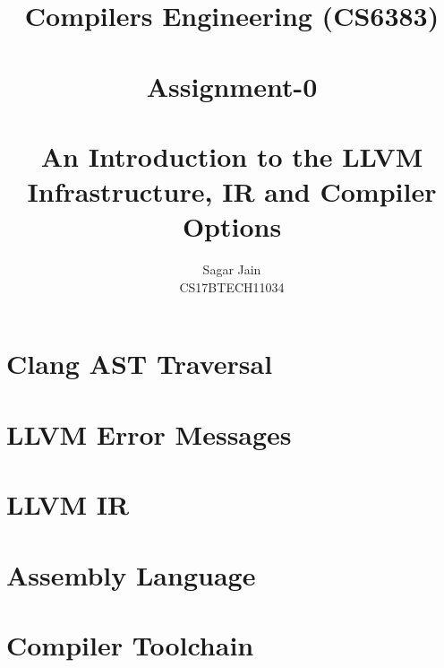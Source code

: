 \documentclass[12pt]{article}
\begin{document}
\title{\textbf{Compilers Engineering  (CS6383)}\\~\\Assignment-0\\~\\An Introduction to the LLVM Infrastructure, IR and Compiler Options}
\author{Sagar Jain\\CS17BTECH11034}
\maketitle
\begin{normalsize}
\tableofcontents
\end{normalsize}
\newpage
\section{Clang AST Traversal}
\section{LLVM Error Messages}
\section{LLVM IR}
\section{Assembly Language}
\section{Compiler Toolchain}
\end{document}
